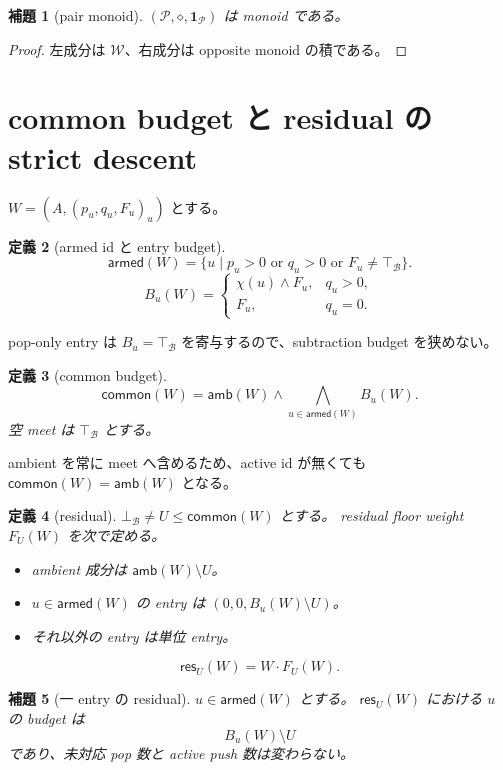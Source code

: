 \documentclass[uplatex,dvipdfmx,a4paper,10.5pt]{jsarticle}
\theoremstyle{jpplain}
\newtheorem{definition}{定義}[section]
\newtheorem{lemma}[definition]{補題}
\newcommand{\Caps}{\mathcal B}
\newcommand{\topc}{\top_{\Caps}}
\newcommand{\botc}{\bot_{\Caps}}
\newcommand{\meet}{\mathbin{\wedge}}
\newcommand{\bigmeet}{\mathop{\bigwedge}}
\newcommand{\diff}{\mathbin{\setminus}}
\newcommand{\Weight}{\mathcal W}
\newcommand{\Pair}{\mathcal P}
\newcommand{\idp}{\mathbf 1_{\Pair}}
\newcommand{\wcomp}{\mathbin{\cdot}}
\newcommand{\pcomp}{\mathbin{\diamond}}
\newcommand{\amb}{\mathsf{amb}}
\newcommand{\armed}{\mathsf{armed}}
\newcommand{\common}{\mathsf{common}}
\newcommand{\res}{\mathsf{res}}
\newcommand{\seed}{\chi}
\begin{document}
\begin{lemma}[pair monoid]
$(\Pair,\pcomp,\idp)$ は monoid である。
\end{lemma}

\begin{proof}
左成分は $\Weight$、右成分は opposite monoid の積である。
\end{proof}

\section{common budget と residual の strict descent}

$W=(A,(p_u,q_u,F_u)_u)$ とする。

\begin{definition}[armed id と entry budget]
\[
 \armed(W)
 =\{u\mid p_u>0\text{ or }q_u>0\text{ or }F_u\neq\topc\}.
\]
\[
 B_u(W)=
 \begin{cases}
   \seed(u)\meet F_u,&q_u>0,\\
   F_u,&q_u=0.
 \end{cases}
\]
\end{definition}

pop-only entry は $B_u=\topc$ を寄与するので、subtraction budget を狭めない。

\begin{definition}[common budget]
\[
  \common(W)
  =\amb(W)\meet
   \bigmeet_{u\in\armed(W)}B_u(W).
\]
空 meet は $\topc$ とする。
\end{definition}

ambient を常に meet へ含めるため、active id が無くても
$\common(W)=\amb(W)$ となる。

\begin{definition}[residual]
$\botc\neq U\leq\common(W)$ とする。
residual floor weight $F_U(W)$ を次で定める。

\begin{itemize}
  \item ambient 成分は $\amb(W)\diff U$。
  \item $u\in\armed(W)$ の entry は $(0,0,B_u(W)\diff U)$。
  \item それ以外の entry は単位 entry。
\end{itemize}

\[
  \res_U(W)=W\wcomp F_U(W).
\]
\end{definition}

\begin{lemma}[一 entry の residual]
$u\in\armed(W)$ とする。
$\res_U(W)$ における $u$ の budget は
\[
  B_u(W)\diff U
\]
であり、未対応 pop 数と active push 数は変わらない。
\end{lemma}
\end{document}

